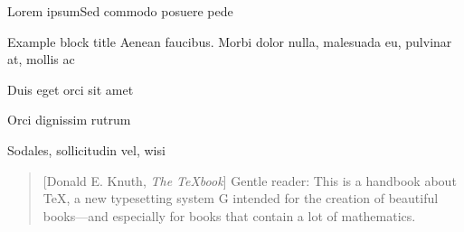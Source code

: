 \documentclass[10pt]{beamer}
\begin{document}
\begin{frame}{Lorem ipsum}{Sed commodo posuere pede}

    \begin{exampleblock}{Example block title}
    Aenean faucibus. Morbi dolor nulla, malesuada eu, pulvinar at, 
    mollis ac
    \end{exampleblock}
    
    \begin{description}[<+->]
    	\item[one] \alert<2>{Duis eget orci sit amet}
    	\item[two] \alert<3>{Orci dignissim rutrum}
    	\item[three] \alert<4>{Sodales, sollicitudin vel, wisi}
    \end{description}

    
    \begin{quotation}[Donald E. Knuth, \emph{The \TeX book}]
Gentle reader: This is a handbook about \TeX, a new typesetting system G intended for the creation of beautiful books—and especially for books that contain a lot of mathematics.
\end{quotation}

\end{frame}
\end{document}
